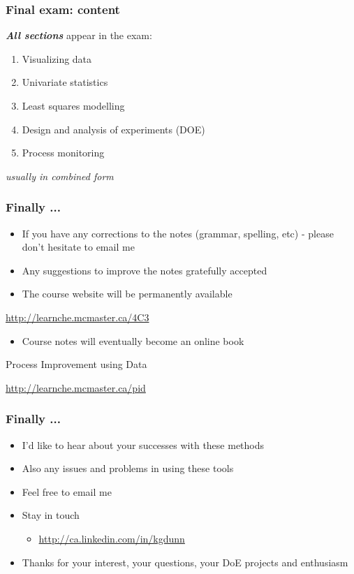 \begin{frame}\frametitle{Final exam: content}
	
	\textbf{\emph{All sections}} appear in the exam:
	\begin{enumerate}
		\item	Visualizing data 
		\item	Univariate statistics 
		\item	Least squares modelling 
		\item	Design and analysis of experiments (DOE) 
		\item	Process monitoring 
	\end{enumerate}
	\emph{usually in combined form}
\end{frame}

\begin{frame}\frametitle{Finally ...}
	\begin{itemize}
		\item	If you have any corrections to the notes (grammar, spelling, etc) - please don't hesitate to email me 
		\item	Any suggestions to improve the notes gratefully accepted 
		\item	The course website will be permanently available 
	\end{itemize}
	\begin{block}{}
		\href{http://learnche.mcmaster.ca/4C3}{http://learnche.mcmaster.ca/4C3}
	\end{block}

	\vspace{24pt}
	\begin{itemize}
		\item	Course notes will eventually become an online book 
	\end{itemize}
		
	\begin{block}
		{Process Improvement using Data} 
		\begin{center}
			\href{http://learnche.mcmaster.ca/pid}{http://learnche.mcmaster.ca/pid} 
		\end{center}
	\end{block}
\end{frame}

\begin{frame}\frametitle{Finally ...}
	\begin{itemize}
		\item	I'd like to hear about your successes with these methods 
		\item	Also any issues and problems in using these tools 
		\item	Feel free to email me
		\item	Stay in touch
		\begin{itemize}
			\item	\href{http://ca.linkedin.com/in/kgdunn}{http://ca.linkedin.com/in/kgdunn}
		\end{itemize}
		\item	Thanks for your interest, your questions, your DoE projects and enthusiasm
	\end{itemize}
\end{frame}
